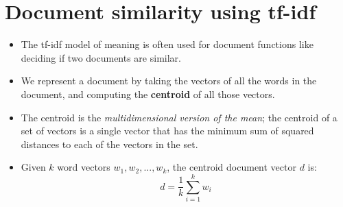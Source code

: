 \section{Document similarity using tf-idf}
\begin{itemize}
    \item The tf-idf model of meaning is often used for document functions like deciding if two documents are similar.

    \item We represent a document by taking the vectors of all the words in the document, and computing the \textbf{centroid} of all those vectors.
    
    \item The centroid is the \textit{multidimensional version of the mean}; the centroid of a set of vectors is a single vector that has the minimum sum of squared distances to each of the vectors in the set.

    \item Given $k$ word vectors $w_1,w_2,...,w_k$, the centroid document vector $d$ is:
    \[
        \displaystyle d = \frac{1}{k}\displaystyle\sum_{i=1}^{k} w_i
    \]

    

\end{itemize}




























































